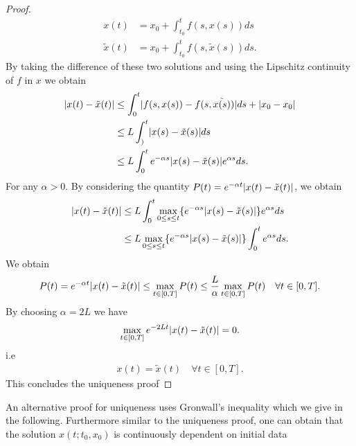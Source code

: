 \begin{proof}
 \begin{align*}
   x(t) &= x_{0} + \int_{t_{0}}^{t} f(s,x(s))  ds \\
   \tilde{x}(t) &= x_{0} + \int_{t_{0}}^{t} f(s,\tilde{x}(s) )   ds
 .\end{align*}
 By taking the difference of these two solutions and using the Lipschitz continuity  of $f$ in $x$ we obtain 
 \begin{align*}
   \lvert x(t)- \tilde{x}(t) \rvert &\le \int_0^{t} \lvert f(s,x(s)) - f(s,\tilde{x(s)} )\rvert ds  + \lvert x_{0}-x_{0}\rvert\\
                             &\le L\int_)^{t} \lvert x(s) - \tilde{x}(s) \rvert   ds \\
                             &\le  L \int_{0}^{t} e^{-\alpha s}  \lvert x(s) - \tilde{x}(s) \rvert e^{\alpha s}  ds
 .\end{align*}
 For any $\alpha >0$. By considering the quantity $P(t) = e^{-\alpha t} \lvert x(t) - \tilde{x}(t) \rvert $, we obtain 
 \begin{align*}
   \lvert x(t) - \tilde{x}(t) \rvert &\le L \int_0^{t} \max_{0 \le s\le t}  \{e^{-\alpha  s}\lvert x(s)-\tilde{x}(s) \rvert \} e^{\alpha  s}    ds \\
                              &\le  L \max_{0\le s\le t} \{e^{-\alpha s}\lvert x(s)-\tilde{x}(s) \rvert \}   \int_0^{t} e^{\alpha s}  ds
 .\end{align*}
 We obtain 
 \begin{align*}
   P(t) = e^{-\alpha t} \lvert x(t)-\tilde{x}(t) \rvert \le \max_{t \in  [0,T]} P(t) \le  \frac{L}{\alpha } \max_{t \in  [0,T]} P(t) \quad \forall t \in [0,T]
 .\end{align*}
 By choosing $\alpha  = 2L$ we have 
 \begin{align*}
   \max_{t \in  [0,T]} e^{-2Lt}  \lvert x(t) - \tilde{x}(t) \rvert = 0
 .\end{align*}
 i.e 
 \begin{align*}
   x(t) = \tilde{x}(t)  \quad \forall t \in [0,T]
 .\end{align*}
This concludes the uniqueness proof
\end{proof}
\begin{remark}
 An alternative proof for uniqueness uses  Gronwall's inequality
 which we give in the following. Furthermore similar to the uniqueness proof, one can 
 obtain that the solution $x(t; t_{0},x_{0})$ is continuously dependent on initial data
\end{remark}
